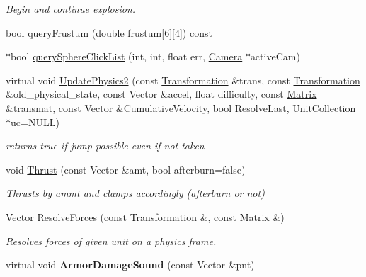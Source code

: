 \begin{DoxyCompactItemize}
\begin{DoxyCompactList}\small\item\em Begin and continue explosion. \end{DoxyCompactList}\item 
bool \hyperlink{classGameUnit_a870fb65b0287bce27c3af657447a4c7b}{query\+Frustum} (double frustum\mbox{[}6\mbox{]}\mbox{[}4\mbox{]}) const 
\item 
$\ast$bool \hyperlink{classGameUnit_ac19d313642f33c5173a7622b2ea297d5}{query\+Sphere\+Click\+List} (int, int, float err, \hyperlink{classCamera}{Camera} $\ast$active\+Cam)
\item 
virtual void \hyperlink{classGameUnit_af229f9e649c3dcf2f7a94082e070cc2b}{Update\+Physics2} (const \hyperlink{structTransformation}{Transformation} \&trans, const \hyperlink{structTransformation}{Transformation} \&old\+\_\+physical\+\_\+state, const Vector \&accel, float difficulty, const \hyperlink{classMatrix}{Matrix} \&transmat, const Vector \&Cumulative\+Velocity, bool Resolve\+Last, \hyperlink{classUnitCollection}{Unit\+Collection} $\ast$uc=N\+U\+LL)
\begin{DoxyCompactList}\small\item\em returns true if jump possible even if not taken \end{DoxyCompactList}\item 
void \hyperlink{classGameUnit_a4ac3e06ce64c3515ab8c4264087d1ae4}{Thrust} (const Vector \&amt, bool afterburn=false)\hypertarget{classGameUnit_a4ac3e06ce64c3515ab8c4264087d1ae4}{}\label{classGameUnit_a4ac3e06ce64c3515ab8c4264087d1ae4}

\begin{DoxyCompactList}\small\item\em Thrusts by ammt and clamps accordingly (afterburn or not) \end{DoxyCompactList}\item 
Vector \hyperlink{classGameUnit_a8d1ce6d41ee6a8504ac4f84f2e2f1ce3}{Resolve\+Forces} (const \hyperlink{structTransformation}{Transformation} \&, const \hyperlink{classMatrix}{Matrix} \&)\hypertarget{classGameUnit_a8d1ce6d41ee6a8504ac4f84f2e2f1ce3}{}\label{classGameUnit_a8d1ce6d41ee6a8504ac4f84f2e2f1ce3}

\begin{DoxyCompactList}\small\item\em Resolves forces of given unit on a physics frame. \end{DoxyCompactList}\item 
virtual void {\bfseries Armor\+Damage\+Sound} (const Vector \&pnt)\hypertarget{classGameUnit_aaebef7534f3ee00576cb1a83eda9f2b6}{}\label{classGameUnit_aaebef7534f3ee00576cb1a83eda9f2b6}


\end{DoxyCompactItemize}
